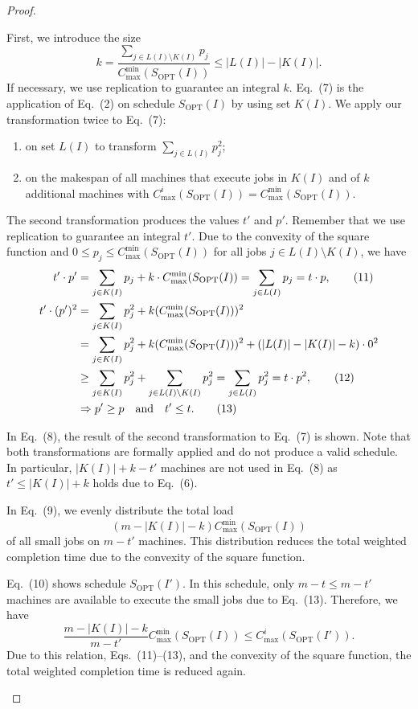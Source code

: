 \documentclass[11pt]{article}
\newcommand{\OPT}{\mathrm{OPT}}
\newcommand{\Cmin}{C_{\max}^{\min}}
\begin{document}
\begin{proof}
\begin{enumerate}[label=(\arabic*)]
First, we introduce the size
\[
        k=
        \frac{\sum_{j\in L(I)\setminus K(I)}p_j}
        {\Cmin(S_{\OPT}(I))}
        \leq
        |L(I)|-|K(I)|.
\]
If necessary, we use replication to guarantee an integral $k$. Eq.~(7) is
the application of Eq.~(2) on schedule $S_{\OPT}(I)$ by using set $K(I)$.
We apply our transformation twice to Eq.~(7):
\begin{enumerate}[label=(\alph*)]
\item on set $L(I)$ to transform $\sum_{j\in L(I)}p_j^2$;
\item on the makespan of all machines that execute jobs in $K(I)$ and of
$k$ additional machines with
$C_{\max}^i(S_{\OPT}(I))=\Cmin(S_{\OPT}(I))$.
\end{enumerate}
The second transformation produces the values $t'$ and $p'$. Remember that
we use replication to guarantee an integral $t'$. Due to the convexity of the
square function and $0\leq p_j\leq \Cmin(S_{\OPT}(I))$ for all jobs
$j\in L(I)\setminus K(I)$, we have
\begin{align}
        t'\cdot p'
        &=
        \sum_{j\in K(I)}p_j+k\cdot\Cmin(S_{\OPT}(I))
        =
        \sum_{j\in L(I)}p_j
        =
        t\cdot p,                                                \tag{11}\\
        t'\cdot(p')^2
        &=
        \sum_{j\in K(I)}p_j^2+k(\Cmin(S_{\OPT}(I)))^2             \notag\\
        &=
        \sum_{j\in K(I)}p_j^2+k(\Cmin(S_{\OPT}(I)))^2
        +(|L(I)|-|K(I)|-k)\cdot 0^2                              \notag\\
        &\geq
        \sum_{j\in K(I)}p_j^2
        +
        \sum_{j\in L(I)\setminus K(I)}p_j^2
        =
        \sum_{j\in L(I)}p_j^2
        =
        t\cdot p^2,                                              \tag{12}\\
        &\Rightarrow
        p'\geq p
        \quad\text{and}\quad
        t'\leq t.                                                \tag{13}
\end{align}

In Eq.~(8), the result of the second transformation to Eq.~(7) is shown.
Note that both transformations are formally applied and do not produce a
valid schedule. In particular, $|K(I)|+k-t'$ machines are not used in
Eq.~(8) as $t'\leq |K(I)|+k$ holds due to Eq.~(6).

In Eq.~(9), we evenly distribute the total load
\[
        (m-|K(I)|-k)\Cmin(S_{\OPT}(I))
\]
of all small jobs on $m-t'$ machines. This distribution reduces the total
weighted completion time due to the convexity of the square function.

Eq.~(10) shows schedule $S_{\OPT}(I')$. In this schedule, only
$m-t\leq m-t'$ machines are available to execute the small jobs due to
Eq.~(13). Therefore, we have
\[
        \frac{m-|K(I)|-k}{m-t'}\Cmin(S_{\OPT}(I))
        \leq
        C_{\max}^i(S_{\OPT}(I')).
\]
Due to this relation, Eqs.~(11)--(13), and the convexity of the square
function, the total weighted completion time is reduced again.
\end{enumerate}
\end{proof}
\end{document}
